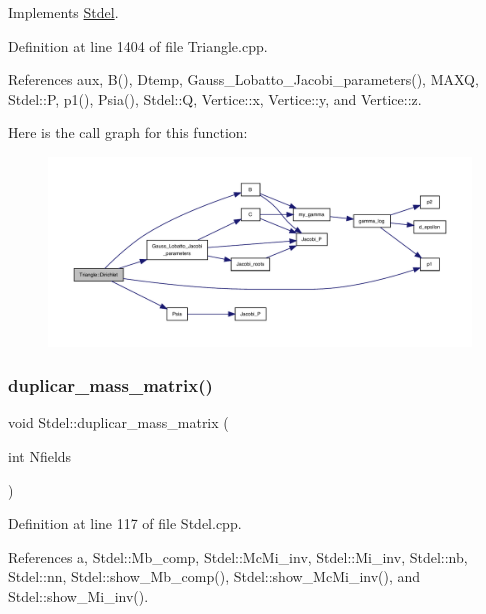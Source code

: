 Implements \hyperlink{classStdel_a92e13b000249ba73b35407d925cbd7a8}{Stdel}.



Definition at line 1404 of file Triangle.\+cpp.



References aux, B(), Dtemp, Gauss\+\_\+\+Lobatto\+\_\+\+Jacobi\+\_\+parameters(), M\+A\+XQ, Stdel\+::P, p1(), Psia(), Stdel\+::Q, Vertice\+::x, Vertice\+::y, and Vertice\+::z.

Here is the call graph for this function\+:
\nopagebreak
\begin{figure}[H]
\begin{center}
\leavevmode
\includegraphics[width=350pt]{classTriangle_a8895a8448dcfdefefb94681518530c0f_cgraph}
\end{center}
\end{figure}
\mbox{\label{classStdel_a922b779be1f8f12b7a5535ab529bff64}} 
\subsubsection{\texorpdfstring{duplicar\+\_\+mass\+\_\+matrix()}{duplicar\_mass\_matrix()}}
{\footnotesize\ttfamily void Stdel\+::duplicar\+\_\+mass\+\_\+matrix (\begin{DoxyParamCaption}\item[{int}]{Nfields }\end{DoxyParamCaption})\hspace{0.3cm}{\ttfamily [inherited]}}



Definition at line 117 of file Stdel.\+cpp.



References a, Stdel\+::\+Mb\+\_\+comp, Stdel\+::\+Mc\+Mi\+\_\+inv, Stdel\+::\+Mi\+\_\+inv, Stdel\+::nb, Stdel\+::nn, Stdel\+::show\+\_\+\+Mb\+\_\+comp(), Stdel\+::show\+\_\+\+Mc\+Mi\+\_\+inv(), and Stdel\+::show\+\_\+\+Mi\+\_\+inv().



